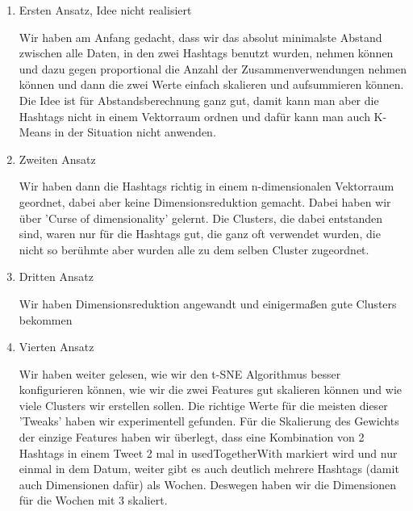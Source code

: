 \begin{enumerate}

\item Ersten Ansatz, Idee nicht realisiert

Wir haben am Anfang gedacht, dass wir das absolut minimalste Abstand zwischen alle Daten, in den zwei Hashtags benutzt wurden, nehmen können und dazu gegen proportional die Anzahl der Zusammenverwendungen nehmen können und dann die zwei Werte einfach skalieren und aufsummieren können. Die Idee ist für Abstandsberechnung ganz gut, damit kann man aber die Hashtags nicht in einem Vektorraum ordnen und dafür kann man auch K-Means in der Situation nicht anwenden.

\item Zweiten Ansatz

Wir haben dann die Hashtags richtig in einem n-dimensionalen Vektorraum geordnet, dabei aber keine Dimensionsreduktion gemacht. Dabei haben wir über 'Curse of dimensionality' gelernt. Die Clusters, die dabei entstanden sind, waren nur für die Hashtags gut, die ganz oft verwendet wurden, die nicht so berühmte aber wurden alle zu dem selben Cluster zugeordnet.

\item Dritten Ansatz

Wir haben Dimensionsreduktion angewandt und einigermaßen gute Clusters bekommen

\item Vierten Ansatz

Wir haben weiter gelesen, wie wir den t-SNE Algorithmus besser konfigurieren können, wie wir die zwei Features gut skalieren können und wie viele Clusters wir erstellen sollen. Die richtige Werte für die meisten dieser 'Tweaks' haben wir experimentell gefunden. Für die Skalierung des Gewichts der einzige Features haben wir überlegt, dass eine Kombination von 2 Hashtags in einem Tweet 2 mal in usedTogetherWith markiert wird und nur einmal in dem Datum, weiter gibt es auch deutlich mehrere Hashtags (damit auch Dimensionen dafür) als Wochen. Deswegen haben wir die Dimensionen für die Wochen mit 3 skaliert.

\end{enumerate}


